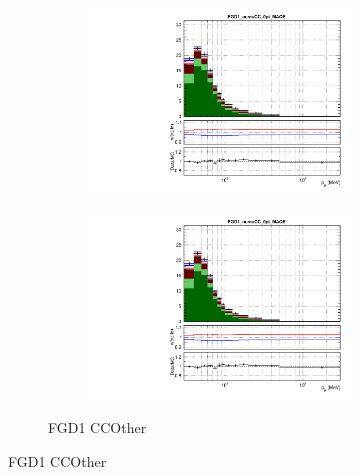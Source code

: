 \begin{figure}[h]
	\begin{subfigure}[t]{\textwidth}
	\begin{subfigure}[t]{0.49\textwidth}
		\includegraphics[width=\textwidth, trim={0mm 0mm 0mm 6mm}, clip,page=101]{figures/mach3/data/postfit/2017b_NewDet_3Xsec_4Det_5Flux_NewXSecTune_Data_merge_PostFit_0_1_rootstack}
	\end{subfigure}
	\begin{subfigure}[t]{0.49\textwidth}
		\includegraphics[width=\textwidth, trim={0mm 0mm 0mm 6mm}, clip,page=102]{figures/mach3/data/postfit/2017b_NewDet_3Xsec_4Det_5Flux_NewXSecTune_Data_merge_PostFit_0_1_rootstack}
	\end{subfigure}
\caption{FGD1 CCOther}
\end{subfigure}
	

\end{figure}
